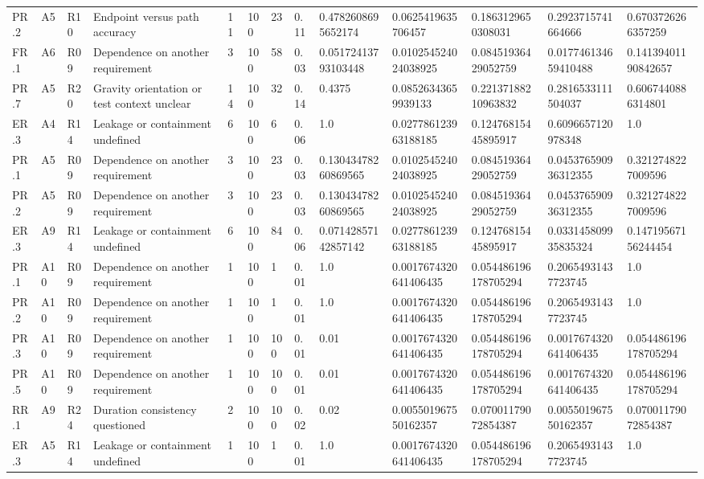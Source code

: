 \begin{tabular}{lllllllllllll}
PR.2 & A5 & R10 & Endpoint versus path accuracy & 11 & 100 & 23 & 0.11 & 0.4782608695652174 & 0.0625419635706457 & 0.1863129650308031 & 0.2923715741664666 & 0.6703726266357259 \\
FR.1 & A6 & R09 & Dependence on another requirement & 3 & 100 & 58 & 0.03 & 0.05172413793103448 & 0.010254524024038925 & 0.08451936429052759 & 0.017746134659410488 & 0.14139401190842657 \\
PR.7 & A5 & R20 & Gravity orientation or test context unclear & 14 & 100 & 32 & 0.14 & 0.4375 & 0.08526343659939133 & 0.22137188210963832 & 0.2816533111504037 & 0.6067440886314801 \\
ER.3 & A4 & R14 & Leakage or containment undefined & 6 & 100 & 6 & 0.06 & 1.0 & 0.027786123963188185 & 0.12476815445895917 & 0.6096657120978348 & 1.0 \\
PR.1 & A5 & R09 & Dependence on another requirement & 3 & 100 & 23 & 0.03 & 0.13043478260869565 & 0.010254524024038925 & 0.08451936429052759 & 0.045376590936312355 & 0.3212748227009596 \\
PR.2 & A5 & R09 & Dependence on another requirement & 3 & 100 & 23 & 0.03 & 0.13043478260869565 & 0.010254524024038925 & 0.08451936429052759 & 0.045376590936312355 & 0.3212748227009596 \\
ER.3 & A9 & R14 & Leakage or containment undefined & 6 & 100 & 84 & 0.06 & 0.07142857142857142 & 0.027786123963188185 & 0.12476815445895917 & 0.033145809935835324 & 0.14719567156244454 \\
PR.1 & A10 & R09 & Dependence on another requirement & 1 & 100 & 1 & 0.01 & 1.0 & 0.0017674320641406435 & 0.054486196178705294 & 0.20654931437723745 & 1.0 \\
PR.2 & A10 & R09 & Dependence on another requirement & 1 & 100 & 1 & 0.01 & 1.0 & 0.0017674320641406435 & 0.054486196178705294 & 0.20654931437723745 & 1.0 \\
PR.3 & A10 & R09 & Dependence on another requirement & 1 & 100 & 100 & 0.01 & 0.01 & 0.0017674320641406435 & 0.054486196178705294 & 0.0017674320641406435 & 0.054486196178705294 \\
PR.5 & A10 & R09 & Dependence on another requirement & 1 & 100 & 100 & 0.01 & 0.01 & 0.0017674320641406435 & 0.054486196178705294 & 0.0017674320641406435 & 0.054486196178705294 \\
RR.1 & A9 & R24 & Duration consistency questioned & 2 & 100 & 100 & 0.02 & 0.02 & 0.005501967550162357 & 0.07001179072854387 & 0.005501967550162357 & 0.07001179072854387 \\
ER.3 & A5 & R14 & Leakage or containment undefined & 1 & 100 & 1 & 0.01 & 1.0 & 0.0017674320641406435 & 0.054486196178705294 & 0.20654931437723745 & 1.0 \\

\end{tabular}
